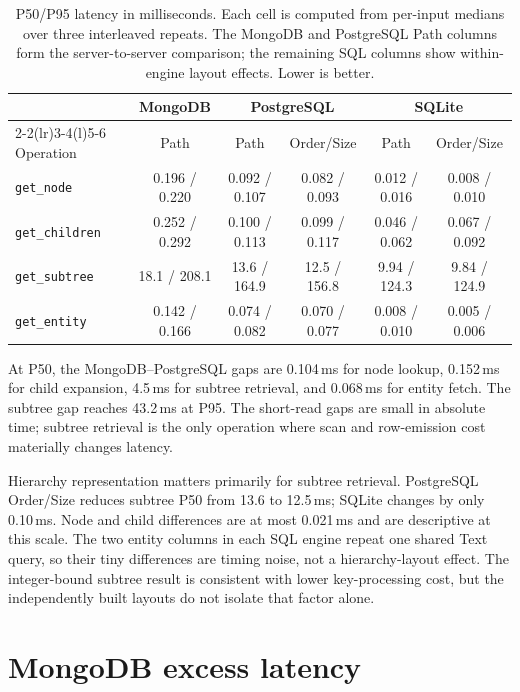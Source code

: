 \documentclass[10pt]{article}
\newcommand{\code}[1]{\texttt{#1}}
\newcommand{\hdr}{\rowcolor{hdrgray}}
\newcommand{\key}{\rowcolor{keyrow}}
\newenvironment{ctab}{\par\smallskip\centering\small
  \setlength{\tabcolsep}{5pt}\renewcommand{\arraystretch}{1.12}}{\par\smallskip}
\begin{document}
\begin{table}[H]
\caption{P50/P95 latency in milliseconds. Each cell is computed from per-input
medians over three interleaved repeats. The MongoDB and PostgreSQL Path columns
form the server-to-server comparison; the remaining SQL columns show
within-engine layout effects. Lower is better.}
\label{tab:all-ops}
\begin{ctab}
\setlength{\tabcolsep}{3.5pt}
\begin{tabular}{@{}lccccc@{}}
\toprule
\hdr & \multicolumn{1}{c}{MongoDB} &
  \multicolumn{2}{c}{PostgreSQL} & \multicolumn{2}{c}{SQLite} \\
\cmidrule(lr){2-2}\cmidrule(lr){3-4}\cmidrule(l){5-6}
\hdr Operation & Path & Path & Order/Size & Path & Order/Size \\
\midrule
\code{get\_node}
  & 0.196 / 0.220 & 0.092 / 0.107 & 0.082 / 0.093
  & 0.012 / 0.016 & 0.008 / 0.010 \\
\code{get\_children}
  & 0.252 / 0.292 & 0.100 / 0.113 & 0.099 / 0.117
  & 0.046 / 0.062 & 0.067 / 0.092 \\
\key\code{get\_subtree}
  & 18.1 / 208.1 & 13.6 / 164.9 & 12.5 / 156.8
  & 9.94 / 124.3 & 9.84 / 124.9 \\
\code{get\_entity}
  & 0.142 / 0.166 & 0.074 / 0.082 & 0.070 / 0.077
  & 0.008 / 0.010 & 0.005 / 0.006 \\
\bottomrule
\end{tabular}
\end{ctab}
\end{table}

At P50, the MongoDB--PostgreSQL gaps are 0.104\,ms for node lookup,
0.152\,ms for child expansion, 4.5\,ms for subtree retrieval, and 0.068\,ms for
entity fetch. The subtree gap reaches 43.2\,ms at P95. The short-read gaps are
small in absolute time; subtree retrieval is the only operation where scan and
row-emission cost materially changes latency.

Hierarchy representation matters primarily for subtree retrieval. PostgreSQL
Order/Size reduces subtree P50 from 13.6 to 12.5\,ms; SQLite changes by only
0.10\,ms. Node and child differences are at most 0.021\,ms and are descriptive
at this scale. The two entity columns in each SQL engine repeat one shared Text
query, so their tiny differences are timing noise, not a hierarchy-layout
effect. The integer-bound subtree result is consistent with lower key-processing
cost, but the independently built layouts do not isolate that factor alone.

\section{MongoDB excess latency}\label{sec:overhead}
\end{document}
